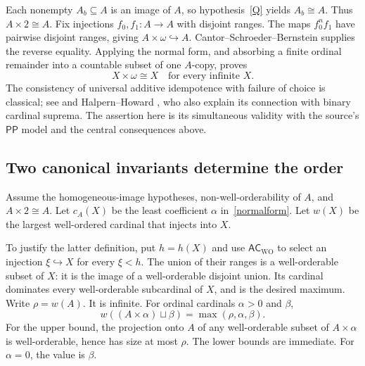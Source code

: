 \documentclass[11pt,a4paper]{article}
\newcommand{\ACWO}{\mathsf{AC}_{\mathrm{WO}}}
\newcommand{\PP}{\mathsf{PP}}
\newcommand{\inj}{\hookrightarrow}
\theoremstyle{definition}
\theoremstyle{remark}
\begin{document}
Each nonempty $A_b\subseteq A$ is an image of $A$, so hypothesis~\ref{Q} yields $A_b\cong A$. Thus $A\times2\cong A$. Fix injections $f_0,f_1:A\to A$ with disjoint ranges. The maps $f_0^nf_1$ have pairwise disjoint ranges, giving $A\times\omega\inj A$. Cantor--Schroeder--Bernstein supplies the reverse equality. Applying the normal form, and absorbing a finite ordinal remainder into a countable subset of one $A$-copy, proves
\begin{equation}\label{absorption}
 X\times\omega\cong X\quad\text{for every infinite }X.
\end{equation}
The consistency of universal additive idempotence with failure of choice is classical; see \cite[Chapter 11, Problem 11]{Jech} and Halpern--Howard \cite{HH}, who also explain its connection with binary cardinal suprema. The assertion here is its simultaneous validity with the source's $\PP$ model and the central consequences above.

\subsection{Two canonical invariants determine the order}
Assume the homogeneous-image hypotheses, non-well-orderability of $A$, and $A\times2\cong A$. Let $c_A(X)$ be the least coefficient $\alpha$ in~\eqref{normalform}. Let $w(X)$ be the largest well-ordered cardinal that injects into $X$.

To justify the latter definition, put $h=h(X)$ and use $\ACWO$ to select an injection $\xi\inj X$ for every $\xi<h$. The union of their ranges is a well-orderable subset of $X$: it is the image of a well-orderable disjoint union. Its cardinal dominates every well-orderable subcardinal of $X$, and is the desired maximum. Write $\rho=w(A)$. It is infinite. For ordinal cardinals $\alpha>0$ and $\beta$,
\begin{equation}\label{wformula}
 w((A\times\alpha)\sqcup\beta)=\max(\rho,\alpha,\beta).
\end{equation}
For the upper bound, the projection onto $A$ of any well-orderable subset of $A\times\alpha$ is well-orderable, hence has size at most $\rho$. The lower bounds are immediate. For $\alpha=0$, the value is $\beta$.
\end{document}
